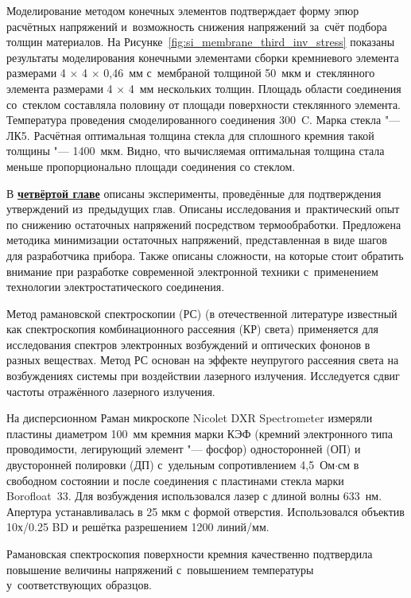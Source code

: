 Моделирование методом конечных элементов
подтверждает форму эпюр расчётных напряжений
и~возможность снижения напряжений за~счёт подбора толщин материалов.
На Рисунке~\ref{fig:si_membrane_third_inv_stress} показаны результаты
моделирования конечными элементами сборки кремниевого элемента
размерами \mbox{4\(\,\times\,\)4\(\,\times\,\)0,46 мм} с~мембраной толщиной
50~мкм и~стеклянного элемента размерами \mbox{4\(\,\times\,\)4 мм} нескольких толщин.
Площадь области соединения со~стеклом составляла половину от
площади поверхности стеклянного элемента.
Температура проведения смоделированного соединения
300~{\textdegree}C. Марка стекла "--- ЛК5.
Расчётная оптимальная толщина стекла для сплошного кремния такой
толщины "--- 1400~мкм.
Видно, что вычисляемая оптимальная толщина стала меньше
пропорционально площади соединения со стеклом.

В \underline{\textbf{четвёртой главе}} описаны эксперименты,
проведённые для подтверждения утверждений из~предыдущих глав. Описаны
исследования и~практический опыт по снижению остаточных напряжений
посредством термообработки. Предложена методика минимизации остаточных
напряжений, представленная в виде шагов для разработчика прибора.
Также описаны сложности, на которые стоит обратить внимание при
разработке современной электронной техники с~применением технологии
электростатического соединения.

Метод рамановской спектроскопии (РС) (в отечественной литературе
известный как спектроскопия комбинационного рассеяния (КР)
света) применяется для исследования спектров электронных возбуждений и
оптических фононов в разных веществах.
Метод РС основан на эффекте неупругого рассеяния света на возбуждениях
системы при воздействии лазерного излучения. Исследуется сдвиг частоты
отражённого лазерного излучения.

На дисперсионном Раман микроскопе Nicolet DXR Spectrometer
измеряли пластины диаметром 100~мм кремния марки КЭФ (кремний
электронного типа проводимости, легирующий элемент "--- фосфор)
односторонней (ОП) и двусторонней полировки (ДП) с~удельным
сопротивлением 4,5~Ом$\cdot$см в свободном состоянии и после
соединения с пластинами стекла марки Borofloat~33.
Для возбуждения использовался лазер с длиной волны 633~нм. Апертура
устанавливалась в 25 мкм с формой отверстия. Использовался объектив
10х/0.25 BD и решётка разрешением 1200 линий/мм.

Рамановская спектроскопия поверхности кремния качественно подтвердила
повышение величины напряжений с~повышением температуры
у~соответствующих образцов.

